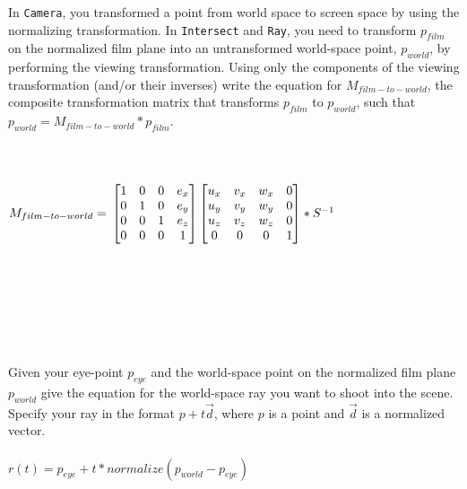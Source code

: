 \documentclass[10pt,twocolumn]{article}
\begin{document}
\begin{framed}
\noindent {\bf [1 point]} In {\tt Camera}, you transformed a point from world space to screen space by using the normalizing transformation. In {\tt Intersect} and {\tt Ray}, you need to transform $p_{film}$ on the normalized film plane into an untransformed world-space point, $p_{world}$, by performing the viewing transformation. Using only the components of the viewing transformation (and/or their inverses) write the equation for $M_{film-to-world}$, the composite transformation matrix that transforms $p_{film}$ to $p_{world}$, such that $p_{world} = M_{film-to-world} * p_{film}$.\\\\\\\\
$M_{film-to-world} = \\\\
                    \begin{bmatrix}
                            1 & 0 & 0 & e_x \\
                            0 & 1 & 0 & e_y \\ 
                            0 & 0 & 1 & e_z \\ 
                            0 & 0 & 0 & 1  \end{bmatrix} 
                    \begin{bmatrix}
                            u_x & v_x & w_x & 0 \\
                            u_y & v_y & w_y & 0 \\ 
                            u_z & v_z & w_z & 0 \\ 
                            0 & 0 & 0 & 1  \end{bmatrix}*S^{-1}$ \\\\\\\\\\\\\\
\end{framed}

\begin{framed}
\noindent {\bf [1 point]} Given your eye-point $p_{eye}$ and the world-space point on the normalized film plane $p_{world}$ give the equation for the world-space ray you want to shoot into the scene. Specify your ray in the format $p + t\vec{d}$, where $p$ is a point and $\vec{d}$ is a normalized vector. \\\\
$r(t) = p_{eye} + t * normalize(p_{world} - p_{eye})$\\\\
\end{framed}
\end{document}
